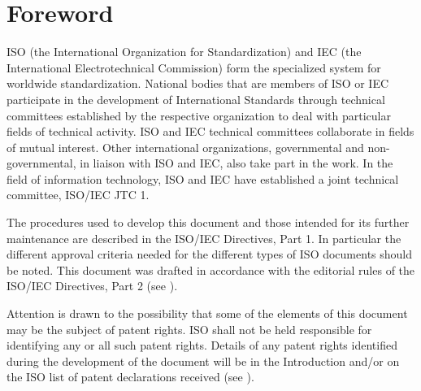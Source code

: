 \chapter{Foreword}


ISO (the International Organization for Standardization) and IEC (the
International Electrotechnical Commission) form the specialized system for
worldwide standardization. National bodies that are members of ISO or IEC
participate in the development of International Standards through technical
committees established by the respective organization to deal with particular
fields of technical activity. ISO and IEC technical committees collaborate in
fields of mutual interest. Other international organizations, governmental and
non-governmental, in liaison with ISO and IEC, also take part in the work. In
the field of information technology, ISO and IEC have established a joint
technical committee, ISO/IEC JTC 1.

The procedures used to develop this document and those intended for its further
maintenance are described in the ISO/IEC Directives, Part 1. In particular the
different approval criteria needed for the different types of ISO documents should
be noted. This document was drafted in accordance with the editorial rules of
the ISO/IEC Directives, Part 2
(see \href{http://www.iso.org/directives}{}).

Attention is drawn to the possibility that some of the elements of this
document may be the subject of patent rights. ISO shall not be held
responsible for identifying any or all such patent rights. Details of any
patent rights identified during the development of the document will be in the
Introduction and/or on the ISO list of patent declarations received
(see \href{http://www.iso.org/patents}{}).


